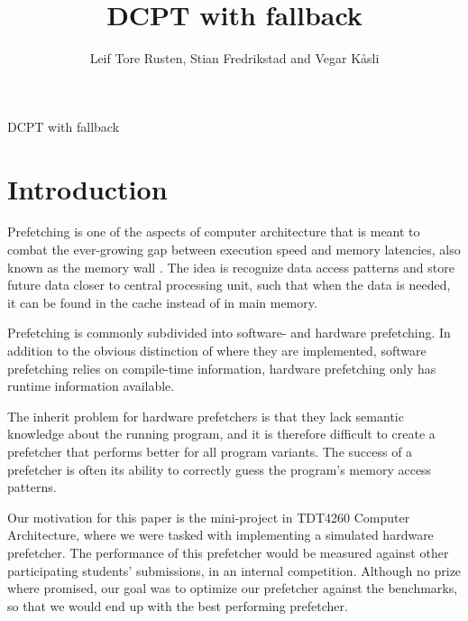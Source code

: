 \documentclass[12pt,journal,compsoc]{IEEEtran}
\begin{document}
\title{DCPT with fallback}
\author{Leif Tore Rusten,
        Stian Fredrikstad and
        Vegar K\aa sli}

%
{DCPT with fallback}


\maketitle
\IEEEdisplaynotcompsoctitleabstractindextext
\IEEEpeerreviewmaketitle

\section{Introduction} Prefetching is one of the aspects of computer
architecture that is meant to combat the ever-growing gap between execution
speed and memory latencies, also known as the memory wall \cite{memwallpaper}.
The idea is recognize data access patterns and store future data closer to
central processing unit, such that when the data is needed, it can be found in
the cache instead of in main memory.

Prefetching is commonly subdivided into software- and hardware prefetching.  In
addition to the obvious distinction of where they are implemented, software
prefetching relies on compile-time information, hardware prefetching only has
runtime information available.

The inherit problem for hardware prefetchers is that they lack semantic
knowledge about the running program, and it is therefore difficult to create a
prefetcher that performs better for all program variants. The success of a
prefetcher is often its ability to correctly guess the program's memory access
patterns. 

Our motivation for this paper is the mini-project in TDT4260 Computer
Architecture, where we were tasked with implementing a simulated hardware
prefetcher. The performance of this prefetcher would be measured against other
participating students' submissions, in an internal competition. Although no
prize where promised, our goal was to optimize our prefetcher against the
benchmarks, so that we would end up with the best performing prefetcher.
\end{document}
